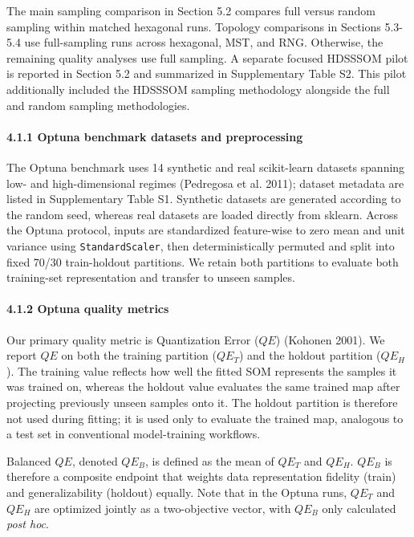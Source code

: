 \documentclass[
]{article}
\providecommand{\DIFadd}[1]{{\protect\color{blue} #1}} %
\providecommand{\DIFaddbegin}{} %
\providecommand{\DIFaddend}{} %
\begin{document}
\DIFadd{The main sampling comparison }\DIFaddend in Section 5.2  \DIFaddbegin \DIFadd{compares }\DIFaddend full versus random
 \DIFaddbegin \DIFadd{sampling within matched hexagonal runs}\DIFaddend . Topology comparisons in Sections
5.3-5.4 use  \DIFaddbegin \DIFadd{full-sampling }\DIFaddend runs across hexagonal, MST, and RNG.
Otherwise, the remaining \DIFaddbegin \DIFadd{quality }\DIFaddend analyses use full sampling. A separate
focused HDSSSOM pilot is reported in Section 5.2 and summarized in
Supplementary Table S2. This pilot additionally included the HDSSSOM
sampling methodology alongside the full and random sampling
methodologies.

\paragraph{4.1.1 Optuna benchmark datasets and
preprocessing}\label{optuna-benchmark-datasets-and-preprocessing}

The Optuna benchmark uses 14 synthetic and real scikit-learn datasets
spanning low- and high-dimensional regimes (Pedregosa et al. 2011);
dataset metadata are listed in Supplementary Table S1. Synthetic
datasets are generated according to the random seed, whereas real
datasets are loaded directly from sklearn. Across the Optuna protocol,
inputs are standardized feature-wise to zero mean and unit variance
using \texttt{StandardScaler}, then deterministically permuted and split
into fixed 70/30 train-holdout partitions. We retain both partitions to
evaluate both training-set representation and transfer to unseen
samples.

\paragraph{4.1.2 Optuna quality metrics}\label{optuna-quality-metrics}

Our primary quality metric is Quantization Error (\(QE\)) (Kohonen
2001). We report \(QE\) on both the training partition (\(QE_T\)) and
the holdout partition (\(QE_H\)). The training value reflects how well
the fitted SOM represents the samples it was trained on, whereas the
holdout value evaluates the same trained map after projecting previously
unseen samples onto it. The holdout partition is therefore not used
during fitting; it is used only to evaluate the trained map, analogous
to a test set in conventional model-training workflows.

Balanced \(QE\), denoted \(QE_B\), is defined as the mean of \(QE_T\)
and \(QE_H\). \(QE_B\) is therefore a composite endpoint that weights
data representation fidelity (train) and  \DIFaddbegin \DIFadd{generalizability }\DIFaddend (holdout)
equally. Note that in the Optuna runs, \(QE_T\) and \(QE_H\) are
optimized jointly as a two-objective vector, with \(QE_B\) only
calculated \emph{post hoc}.
\end{document}
